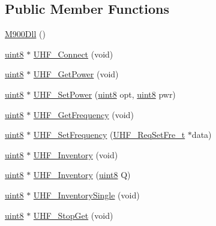 \subsection*{Public Member Functions}
\begin{DoxyCompactItemize}
\item 
\mbox{\hyperlink{class_m900_dll_aa2e1ef624394965f93614ca2c6913383}{M900\+Dll}} ()
\item 
\mbox{\hyperlink{m900dll_8h_adde6aaee8457bee49c2a92621fe22b79}{uint8}} $\ast$ \mbox{\hyperlink{class_m900_dll_a1dc3932fe303c73e955cb116b404e197}{U\+H\+F\+\_\+\+Connect}} (void)
\item 
\mbox{\hyperlink{m900dll_8h_adde6aaee8457bee49c2a92621fe22b79}{uint8}} $\ast$ \mbox{\hyperlink{class_m900_dll_a932d5e7af180d89a058eaed2302513c6}{U\+H\+F\+\_\+\+Get\+Power}} (void)
\item 
\mbox{\hyperlink{m900dll_8h_adde6aaee8457bee49c2a92621fe22b79}{uint8}} $\ast$ \mbox{\hyperlink{class_m900_dll_a97bd73d44f6826ddd641973ca46d960b}{U\+H\+F\+\_\+\+Set\+Power}} (\mbox{\hyperlink{m900dll_8h_adde6aaee8457bee49c2a92621fe22b79}{uint8}} opt, \mbox{\hyperlink{m900dll_8h_adde6aaee8457bee49c2a92621fe22b79}{uint8}} pwr)
\item 
\mbox{\hyperlink{m900dll_8h_adde6aaee8457bee49c2a92621fe22b79}{uint8}} $\ast$ \mbox{\hyperlink{class_m900_dll_aa436421b44f8bd5f956f39dc180b7fe2}{U\+H\+F\+\_\+\+Get\+Frequency}} (void)
\item 
\mbox{\hyperlink{m900dll_8h_adde6aaee8457bee49c2a92621fe22b79}{uint8}} $\ast$ \mbox{\hyperlink{class_m900_dll_a904f3f435c05f40bf102017dc4636cac}{U\+H\+F\+\_\+\+Set\+Frequency}} (\mbox{\hyperlink{struct_u_h_f___req_set_fre__t}{U\+H\+F\+\_\+\+Req\+Set\+Fre\+\_\+t}} $\ast$data)
\item 
\mbox{\hyperlink{m900dll_8h_adde6aaee8457bee49c2a92621fe22b79}{uint8}} $\ast$ \mbox{\hyperlink{class_m900_dll_a0f47f84947ac9f5bdd7080319663eb31}{U\+H\+F\+\_\+\+Inventory}} (void)
\item 
\mbox{\hyperlink{m900dll_8h_adde6aaee8457bee49c2a92621fe22b79}{uint8}} $\ast$ \mbox{\hyperlink{class_m900_dll_af4d928099af991f4357b8fda4eee5501}{U\+H\+F\+\_\+\+Inventory}} (\mbox{\hyperlink{m900dll_8h_adde6aaee8457bee49c2a92621fe22b79}{uint8}} Q)
\item 
\mbox{\hyperlink{m900dll_8h_adde6aaee8457bee49c2a92621fe22b79}{uint8}} $\ast$ \mbox{\hyperlink{class_m900_dll_a3be2c1f7556d8e05e7de1f4100d38c6f}{U\+H\+F\+\_\+\+Inventory\+Single}} (void)
\item 
\mbox{\hyperlink{m900dll_8h_adde6aaee8457bee49c2a92621fe22b79}{uint8}} $\ast$ \mbox{\hyperlink{class_m900_dll_af3cd29c6fc42f5ef07b59301b93b4eca}{U\+H\+F\+\_\+\+Stop\+Get}} (void)

\end{DoxyCompactItemize}
